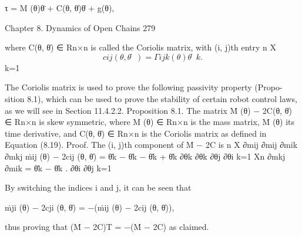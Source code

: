 \documentclass[12pt,a4paper]{article}
\begin{document}
                                  τ = M (θ)θ̈ + C(θ, θ̇)θ̇ + g(θ),


Chapter 8. Dynamics of Open Chains                                                                  279

where C(θ, θ̇) ∈ Rn×n is called the Coriolis matrix, with (i, j)th entry
                                                    n
                                                    X
\begin{equation}
cij (θ, θ̇) =         Γijk (θ)θ̇k .
\label{eq:8.19}
\end{equation}
                                                    k=1

The Coriolis matrix is used to prove the following passivity property (Propo-
sition 8.1), which can be used to prove the stability of certain robot control
laws, as we will see in Section 11.4.2.2.
Proposition 8.1. The matrix Ṁ (θ) − 2C(θ, θ̇) ∈ Rn×n is skew symmetric,
where M (θ) ∈ Rn×n is the mass matrix, Ṁ (θ) its time derivative, and C(θ, θ̇) ∈
Rn×n is the Coriolis matrix as defined in Equation (8.19).
Proof. The (i, j)th component of Ṁ − 2C is
                                       n
                                       X ∂mij                ∂mij       ∂mik       ∂mkj
       ṁij (θ) − 2cij (θ, θ̇)    =                  θ̇k −        θ̇k −      θ̇k +      θ̇k
                                              ∂θk             ∂θk        ∂θj        ∂θi
                                       k=1
                                       Xn
                                             ∂mkj       ∂mik
                                  =               θ̇k −      θ̇k .
                                              ∂θi        ∂θj
                                       k=1

By switching the indices i and j, it can be seen that

                       ṁji (θ) − 2cji (θ, θ̇) = −(ṁij (θ) − 2cij (θ, θ̇)),

thus proving that (Ṁ − 2C)T = −(Ṁ − 2C) as claimed.
\end{document}
